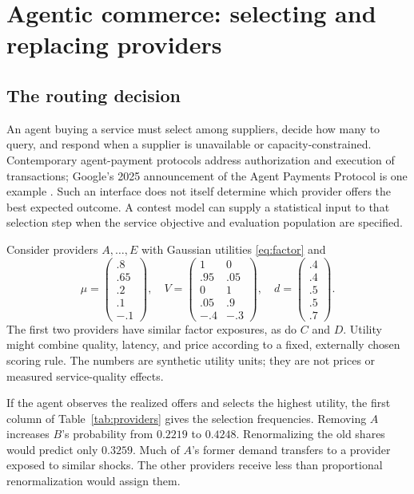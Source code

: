 \documentclass[11pt]{amsart}
\theoremstyle{definition}
\begin{document}
\section{Agentic commerce: selecting and replacing providers}\label{sec:commerce}

\subsection{The routing decision}
An agent buying a service must select among suppliers, decide how many to query, and respond when a supplier is unavailable or capacity-constrained. Contemporary agent-payment protocols address authorization and execution of transactions; Google's 2025 announcement of the Agent Payments Protocol is one example \cite{ap2}. Such an interface does not itself determine which provider offers the best expected outcome. A contest model can supply a statistical input to that selection step when the service objective and evaluation population are specified.

Consider providers $A,\ldots,E$ with Gaussian utilities \eqref{eq:factor} and
\begin{equation}\label{eq:provider_data}
 \mu=\begin{pmatrix}.8\\.65\\.2\\.1\\-.1\end{pmatrix},\quad
 V=\begin{pmatrix}1&0\\.95&.05\\0&1\\.05&.9\\-.4&-.3\end{pmatrix},\quad
 d=\begin{pmatrix}.4\\.4\\.5\\.5\\.7\end{pmatrix}.
\end{equation}
The first two providers have similar factor exposures, as do $C$ and $D$. Utility might combine quality, latency, and price according to a fixed, externally chosen scoring rule. The numbers are synthetic utility units; they are not prices or measured service-quality effects.

If the agent observes the realized offers and selects the highest utility, the first column of Table~\ref{tab:providers} gives the selection frequencies. Removing $A$ increases $B$'s probability from $0.2219$ to $0.4248$. Renormalizing the old shares would predict only $0.3259$. Much of $A$'s former demand transfers to a provider exposed to similar shocks. The other providers receive less than proportional renormalization would assign them.
\end{document}
